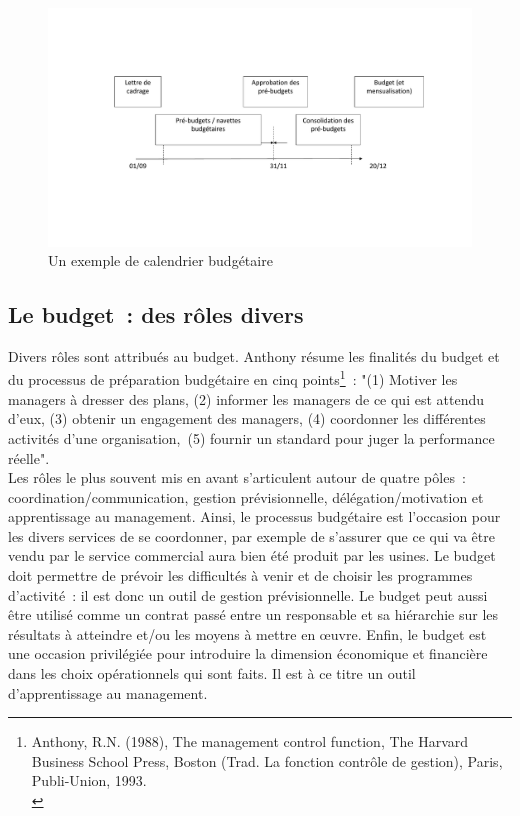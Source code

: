 \documentclass{tufte-handout}
\begin{document}
\begin{figure}[htbp]
\centering
\includegraphics[width=.9\linewidth]{./img/budgetcal.pdf}
\caption{Un exemple de calendrier budgétaire}
\end{figure}
\subsection{Le budget : des rôles divers}
\label{sec:org3d2c7dd}
Divers rôles sont attribués au budget. Anthony résume les finalités du budget et du processus de préparation budgétaire en cinq points\footnote{Anthony, R.N. (1988), The management control function, The Harvard Business School Press, Boston (Trad. La fonction contrôle de gestion), Paris, Publi-Union, 1993.\\} : "(1) Motiver les managers à dresser des plans, (2) informer les managers de ce qui est attendu d'eux, (3) obtenir un engagement des managers, (4) coordonner les différentes activités d'une organisation, (5) fournir un standard pour juger la performance réelle".\\
Les rôles le plus souvent mis en avant s'articulent autour de quatre pôles : coordination/communication, gestion prévisionnelle, délégation/motivation et apprentissage au management. Ainsi, le processus budgétaire est l'occasion pour les divers services de se coordonner, par exemple de s'assurer que ce qui va être vendu par le service commercial aura bien été produit par les usines. Le budget doit permettre de prévoir les difficultés à venir et de choisir les programmes d'activité : il est donc un outil de gestion prévisionnelle. Le budget peut aussi être utilisé comme un contrat passé entre un responsable et sa hiérarchie sur les résultats à atteindre et/ou les moyens à mettre en œuvre. Enfin, le budget est une occasion privilégiée pour introduire la dimension économique et financière dans les choix opérationnels qui sont faits. Il est à ce titre un outil d'apprentissage au management.\\
\end{document}
